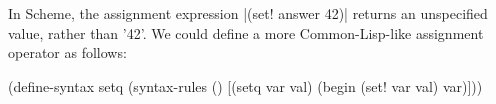 \documentclass{article}
\begin{document}
In Scheme, the assignment expression \scheme|(set! answer 42)|
returns an unspecified value, rather than \scheme'42'.  We
could define a more Common-Lisp-like assignment operator as
follows:

\begin{schemedisplay}
(define-syntax setq
  (syntax-rules ()
    [(setq var val)
     (begin (set! var val)
            var)]))
\end{schemedisplay}
\end{document}
